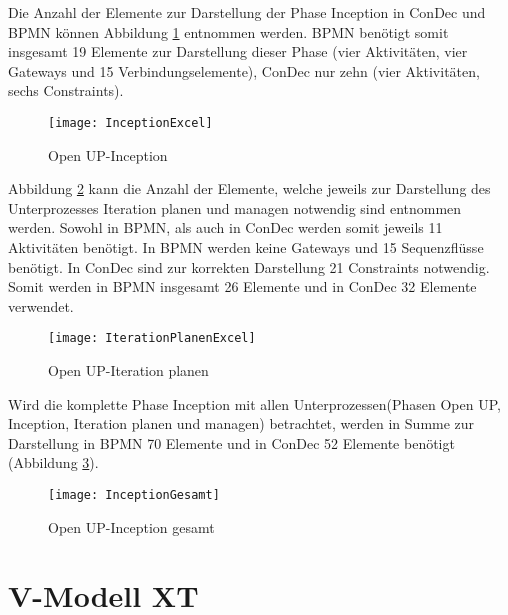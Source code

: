 Die Anzahl der Elemente zur Darstellung der Phase Inception in ConDec und BPMN können Abbildung \ref{fig:InceptionExcel} entnommen werden. BPMN benötigt somit insgesamt 19 Elemente zur Darstellung dieser Phase (vier Aktivitäten, vier Gateways und 15 Verbindungselemente), ConDec nur zehn (vier Aktivitäten, sechs Constraints). \newline
\begin{figure}[htp]
\begin{center}
  \texttt{[image: InceptionExcel]} %
  \caption{Open UP-Inception}
  \label{fig:InceptionExcel}
\end{center}
\end{figure}

Abbildung \ref{fig:IterationPlanenExcel} kann die Anzahl der Elemente, welche jeweils zur Darstellung des Unterprozesses Iteration planen und managen notwendig sind entnommen werden. Sowohl in BPMN, als auch in ConDec werden somit jeweils 11 Aktivitäten benötigt. In BPMN werden keine Gateways und 15 Sequenzflüsse benötigt. In ConDec sind zur korrekten Darstellung 21 Constraints notwendig. Somit werden in BPMN insgesamt 26 Elemente und in ConDec 32 Elemente verwendet.\newline

\begin{figure}[htp]
\begin{center}
  \texttt{[image: IterationPlanenExcel]} %
  \caption{Open UP-Iteration planen}
  \label{fig:IterationPlanenExcel}
\end{center}
\end{figure}

Wird die komplette Phase Inception mit allen Unterprozessen(Phasen Open UP, Inception, Iteration planen und managen) betrachtet, werden in Summe zur Darstellung in BPMN 70 Elemente und in ConDec 52 Elemente benötigt (Abbildung \ref{fig:InceptionGesamt}).

\begin{figure}[htp]
\begin{center}
  \texttt{[image: InceptionGesamt]} %
  \caption{Open UP-Inception gesamt }
  \label{fig:InceptionGesamt}
\end{center}
\end{figure}


\section{V-Modell XT}



